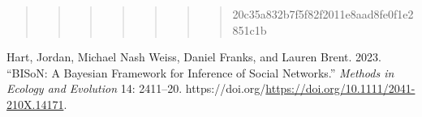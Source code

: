 \documentclass[
  letterpaper,
  DIV=11,
  numbers=noendperiod]{scrartcl}
\newlength{\cslhangindent}
\newenvironment{CSLReferences}[2] %
 {\begin{list}{}{%
  \setlength{\itemindent}{0pt}
  \setlength{\leftmargin}{0pt}
  \setlength{\parsep}{0pt}
  \ifodd #1
   \setlength{\leftmargin}{\cslhangindent}
   \setlength{\itemindent}{-1\cslhangindent}
  \fi
  \setlength{\itemsep}{#2\baselineskip}}}
 {\end{list}}
\begin{document}
\begin{quote}
\begin{quote}
\begin{quote}
\begin{quote}
\begin{quote}
\begin{quote}
\begin{quote}
20c35a832b7f5f82f2011e8aad8fe0f1e2851c1b
\end{quote}
\end{quote}
\end{quote}
\end{quote}
\end{quote}
\end{quote}
\end{quote}

\label{refs}
\begin{CSLReferences}{1}{0}
Hart, Jordan, Michael Nash Weiss, Daniel Franks, and Lauren Brent. 2023.
{``BISoN: A Bayesian Framework for Inference of Social Networks.''}
\emph{Methods in Ecology and Evolution} 14: 2411--20.
https://doi.org/\url{https://doi.org/10.1111/2041-210X.14171}.

\end{CSLReferences}
\end{document}
